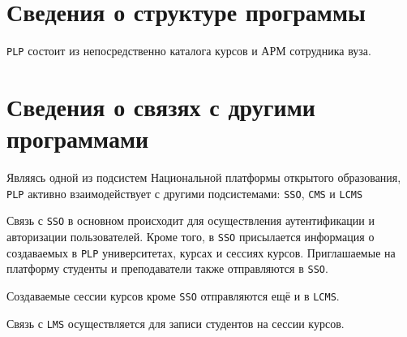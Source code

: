 \section{Сведения о структуре программы}
\texttt{PLP} состоит из непосредственно каталога курсов и АРМ сотрудника вуза.
\section{Сведения о связях с другими программами}
Являясь одной из подсистем Национальной платформы открытого образования,
\texttt{PLP} активно взаимодействует с другими подсистемами:
\texttt{SSO}, \texttt{CMS} и \texttt{LCMS}

Связь с \texttt{SSO} в основном происходит для осуществления аутентификации и авторизации пользователей.
Кроме того, в \texttt{SSO} присылается информация о создаваемых в \texttt{PLP}
университетах, курсах и сессиях курсов. Приглашаемые на платформу студенты и преподаватели
также отправляются в \texttt{SSO}.

Создаваемые сессии курсов кроме \texttt{SSO} отправляются ещё и в \texttt{LCMS}.

Связь с \texttt{LMS} осуществляется для записи студентов на сессии курсов.
